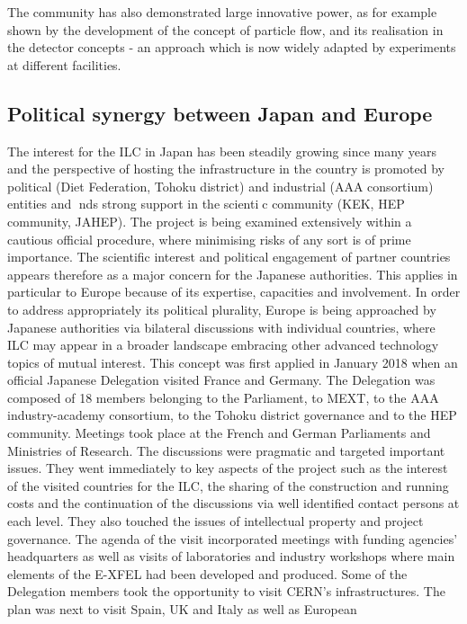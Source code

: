 \documentclass[%
 reprint,
 floatfix,
 amsmath,amssymb,
 aps,
]{revtex4-1}
\begin{document}
The community has also demonstrated large innovative power, as for example shown 
by the development of the concept of particle flow, and its realisation in the 
detector concepts - an approach which is now widely adapted by experiments at 
different facilities. 

\subsection{\label{sec:discussionPol}Political synergy between Japan and Europe}

The interest for the ILC in Japan has been steadily growing since many years and the perspective
of hosting the infrastructure in the country is promoted by political (Diet Federation, Tohoku district)
and industrial (AAA consortium) entities and nds strong support in the scientic community (KEK,
HEP community, JAHEP). The project is being examined extensively within a cautious official procedure, 
where minimising risks of any sort is of prime importance. The scientific interest and political
engagement of partner countries appears therefore as a major concern for the Japanese authorities. This
applies in particular to Europe because of its expertise, capacities and involvement.
In order to address appropriately its political plurality, Europe is being approached by Japanese
authorities via bilateral discussions with individual countries, where ILC may appear in a broader
landscape embracing other advanced technology topics of mutual interest. This concept was first applied
in January 2018 when an official Japanese Delegation visited France and Germany. The Delegation
was composed of 18 members belonging to the Parliament, to MEXT, to the AAA industry-academy
consortium, to the Tohoku district governance and to the HEP community. Meetings took place at
the French and German Parliaments and Ministries of Research. The discussions were pragmatic and
targeted important issues. They went immediately to key aspects of the project such as the interest of
the visited countries for the ILC, the sharing of the construction and running costs and the continuation
of the discussions via well identified contact persons at each level. They also touched the issues of
intellectual property and project governance. The agenda of the visit incorporated meetings with funding
agencies' headquarters as well as visits of laboratories and industry workshops where main elements of
the E-XFEL had been developed and produced. Some of the Delegation members took the opportunity
to visit CERN's infrastructures. The plan was next to visit Spain, UK and Italy as well as European
\end{document}
